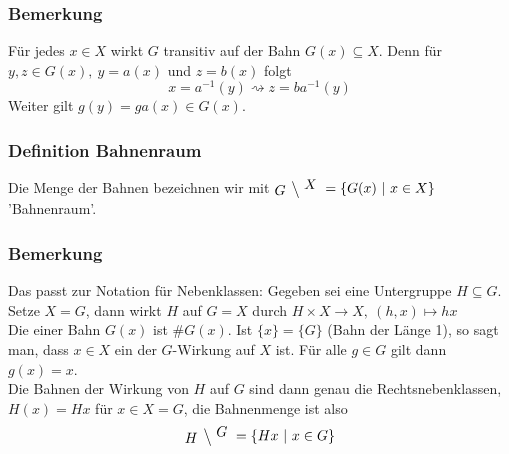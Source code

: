 \subsubsection*{Bemerkung}
Für jedes $x\in X$ wirkt $G$ transitiv auf der Bahn $G(x)\subseteq X$.
Denn für $y,z\in G(x),~y=a(x)$ und $z=b(x)$ folgt
\[
x=a^{-1}(y) \rightsquigarrow z=ba^{-1}(y)
\]
Weiter gilt $g(y)=ga(x)\in G(x)$.

\subsubsection*{Definition Bahnenraum}
Die Menge der Bahnen bezeichnen wir mit $\xfrac{G}{X}=\{G(x)~|~x\in X \}$ 'Bahnenraum'.

\subsubsection*{Bemerkung}
Das passt zur Notation für Nebenklassen: 
Gegeben sei eine Untergruppe $H\subseteq G$. 
Setze $X=G$, dann wirkt $H$ auf $G=X$ durch $H\times X\to X,~(h,x)\mapsto hx$\\
Die  einer Bahn $G(x)$ ist $\#G(x)$. 
Ist $\{x\}=\{G\}$ (Bahn der Länge 1), so sagt man, dass $x\in X$ ein  der $G$-Wirkung auf $X$ ist. 
Für alle $g\in G$ gilt dann $g(x)=x$.\\
Die Bahnen der Wirkung von $H$ auf $G$ sind dann genau die Rechtsnebenklassen, $H(x)=Hx$ für $x\in X=G$, die Bahnenmenge ist also 
\[
\xfrac{H}{G}=\{Hx~|~x\in G\}
\]

\newpage
